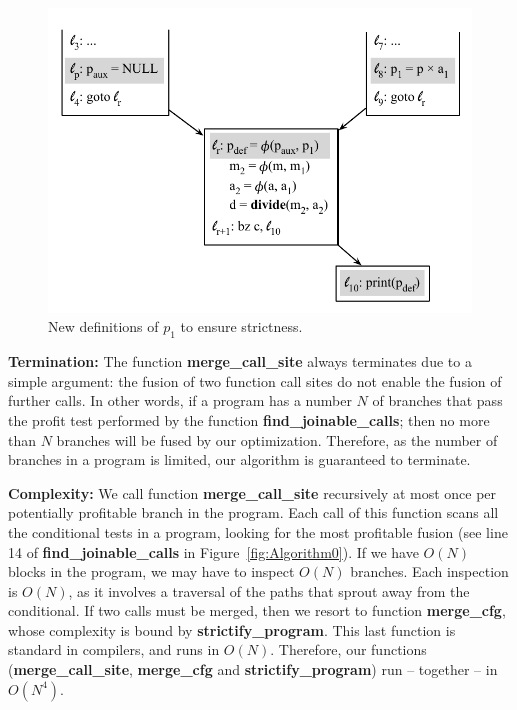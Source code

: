 \documentclass[times,10pt,twocolumn]{article}
\begin{document}
\begin{figure}[t!]
\begin{center}
\includegraphics[width=1\columnwidth]{images/Strictify}
\end{center}
\caption{\label{fig:Strictify}
New definitions of $p_1$ to ensure strictness.}
\end{figure}

\noindent
\textbf{Termination: }
The function \textbf{merge\_call\_site} always terminates due to a simple
argument: the fusion of two function call sites do not enable the fusion of
further calls.
In other words, if a program has a number $N$ of branches that pass the profit
test performed by the function \textbf{find\_joinable\_calls}; then no more than
$N$ branches will be fused by our optimization.
Therefore, as the number of branches in a program is limited, our algorithm
is guaranteed to terminate.

\noindent
\textbf{Complexity: }
We call function \textbf{merge\_call\_site} recursively at most once per
potentially profitable branch in the program.
Each call of this function scans all the conditional tests in a program,
looking for the most profitable fusion (see line 14 of
\textbf{find\_joinable\_calls} in Figure~\ref{fig:Algorithm0}).
If we have $O(N)$ blocks in the program, we may have to inspect $O(N)$ branches.
Each inspection is $O(N)$, as it involves a traversal of the paths that
sprout away from the conditional.
If two calls must be merged, then we resort to function \textbf{merge\_cfg},
whose complexity is bound by \textbf{strictify\_program}.
This last function is standard in compilers, and runs in $O(N)$.
Therefore, our functions (\textbf{merge\_call\_site}, \textbf{merge\_cfg} and
\textbf{strictify\_program}) run -- together -- in $O(N^4)$.
\end{document}
